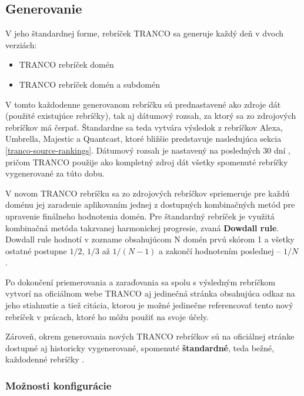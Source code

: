 \subsection{Generovanie}
\label{tranco-generation}

V jeho štandardnej forme, rebríček TRANCO sa generuje každý deň v dvoch verziách:
\begin{itemize}
    \item TRANCO rebríček domén
    \item TRANCO rebríček domén a subdomén
\end{itemize}

V tomto každodenne generovanom rebríčku sú prednastavené ako zdroje dát (použité existujúce rebríčky), tak aj dátumový rozsah, za ktorý sa zo zdrojových rebríčkov má čerpať.
Štandardne sa teda vytvára výsledok z rebríčkov Alexa, Umbrella, Majestic a Quantcast, ktoré bližšie predstavuje nasledujúca sekcia \ref{tranco-source-rankings}. 
Dátumový rozsah je nastavený na posledných 30 dní \cite{tranco-github}, pričom TRANCO použije ako kompletný zdroj dát všetky spomenuté rebríčky vygenerované za túto dobu. 

\pagebreak

V novom TRANCO rebríčku sa zo zdrojových rebríčkov spriemeruje pre každú doménu jej zaradenie aplikovaním jednej z dostupných kombinačných metód pre upravenie finálneho hodnotenia domén.
Pre štandardný rebríček je využitá kombinačná metóda takzvanej harmonickej progresie, zvaná \textbf{Dowdall rule}. Dowdall rule hodnotí v zozname obsahujúcom N domén prvú skórom 1 a všetky ostatné postupne \(1/2\), \(1/3\) až \(1/(N-1)\) a zakončí hodnotením poslednej -- \(1/N\) \cite{tranco, tranco-homepage}.

Po dokončení priemerovania a zaraďovania sa spolu s výsledným rebríčkom vytvorí na oficiálnom webe TRANCO aj jedinečná stránka obsahujúca odkaz na jeho stiahnutie a tiež citácia, 
ktorou je možné jedinečne referencovať tento nový rebríček v prácach, ktoré ho môžu použiť na svoje účely.

Zároveň, okrem generovania nových TRANCO rebríčkov sú na oficiálnej stránke dostupné aj historicky vygenerované, spomenuté \textbf{štandardné}, teda bežné, každodenné rebríčky \cite{tranco-homepage}.

\subsubsection{Možnosti konfigurácie}
\label{tranco-config}


